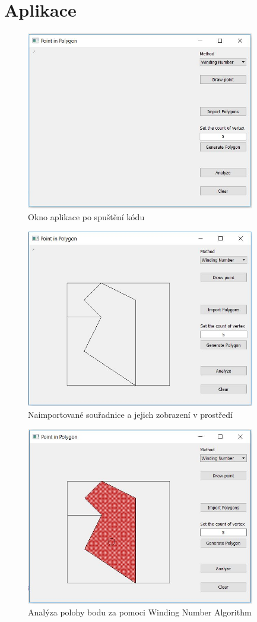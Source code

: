\documentclass[a4paper, 12pt]{article}
\begin{document}
\clearpage
\section{Aplikace}

\begin{figure}[h!]
	\centering
	\includegraphics[width=10cm]{okno.jpg}
	\caption{Okno aplikace po spuštění kódu}
\end{figure}

\begin{figure}[h!]
	\centering
	\includegraphics[width=10cm]{import.jpg}
	\caption{Naimportované souřadnice a jejich zobrazení v prostředí}
\end{figure}

\begin{figure}[h!]
	\centering
	\includegraphics[width=10cm]{analyze_inside.jpg}
	\caption{Analýza polohy bodu za pomoci Winding Number Algorithm}
\end{figure}
\end{document}
